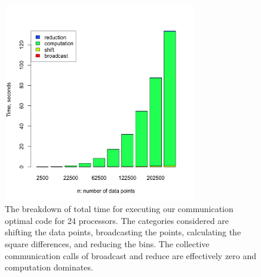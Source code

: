 \begin{figure}[!h]
   \centering
   \includegraphics[width=0.75\textwidth]{./fig/comm_24_breakdown.png} %
   \caption{The breakdown of total time for executing our communication optimal code for 24 processors. The categories considered are shifting the data points, broadcasting the points, calculating the square differences, and reducing the bins. The collective communication calls of broadcast and reduce are effectively zero and computation dominates. }
   \label{fig:allc_breakdown}
\end{figure}

